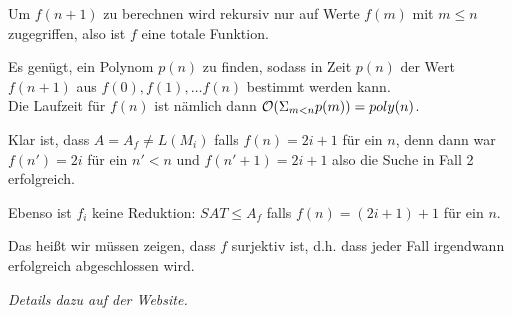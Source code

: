 Um $f(n+1)$ zu berechnen wird rekursiv nur auf Werte $f(m)$ mit $m \leq n$ zugegriffen, also ist $f$ eine totale Funktion.

Es genügt, ein Polynom $p(n)$ zu finden, sodass in Zeit $p(n)$ der Wert $f(n+1)$ aus $f(0), f(1), \dots f(n)$ bestimmt werden kann.\\
Die Laufzeit für $f(n)$ ist nämlich dann $\mathcal{O}(\Sigma_{m < n} p(m)) = poly(n)$.


Klar ist, dass $A = A_f \neq L(M_i)$ falls $f(n) = 2i+1$ für ein $n$, denn dann war $f(n') = 2i$ für ein $n' < n$ und $f(n'+1) = 2i+1$ also die Suche in Fall 2 erfolgreich.

Ebenso ist $f_i$ keine Reduktion: $SAT \leq A_f$ falls $f(n) = (2i+1)+1$ für ein $n$.

Das heißt wir müssen zeigen, dass $f$ surjektiv ist, d.h. dass jeder Fall irgendwann erfolgreich abgeschlossen wird.


\textit{Details dazu auf der Website.}










